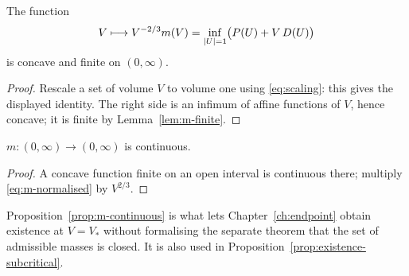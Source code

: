 \begin{lemma}\label{lem:m-concave}
The function
\begin{equation}\label{eq:m-normalised}
  V\longmapsto V^{-2/3}m(V)=\inf_{|U|=1}\bigl(P(U)+V\,D(U)\bigr)
\end{equation}
is concave and finite on $(0,\infty)$.
\end{lemma}

\begin{proof}
Rescale a set of volume $V$ to volume one using \eqref{eq:scaling}: this
gives the displayed identity.  The right side is an infimum of affine
functions of $V$, hence concave; it is finite by
Lemma~\ref{lem:m-finite}.
\end{proof}

\begin{proposition}[Continuity of $m$]\label{prop:m-continuous}
$m:(0,\infty)\to(0,\infty)$ is continuous.
\end{proposition}

\begin{proof}
A concave function finite on an open interval is continuous there; multiply
\eqref{eq:m-normalised} by $V^{2/3}$.
\end{proof}

\begin{fnote}\label{fnote:why-continuity}
Proposition~\ref{prop:m-continuous} is what lets
Chapter~\ref{ch:endpoint} obtain existence at $V=V_*$ without formalising the
separate theorem that the set of admissible masses is closed.  It is also used
in Proposition~\ref{prop:existence-subcritical}.
\end{fnote}

